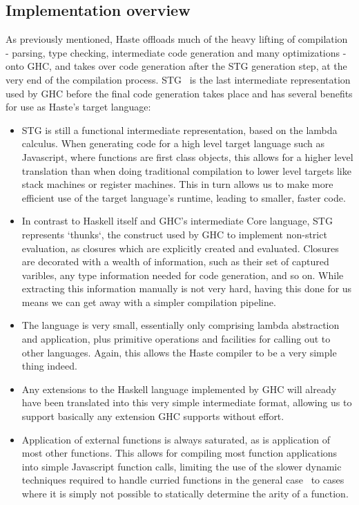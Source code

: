 \documentclass[preprint]{sigplanconf}
\begin{document}
\subsection{Implementation overview}

As previously mentioned, Haste offloads much of the heavy lifting of
compilation - parsing, type checking, intermediate code generation and many
optimizations - onto GHC, and takes over code generation after the STG
generation step, at the very end of the compilation process. STG\ \cite{stg} is
the last intermediate representation used by GHC before the final code
generation takes place and has several benefits for use as Haste's target
language:

\begin{itemize}
  \item STG is still a functional intermediate representation, based on the
        lambda calculus. When generating code for a high level target language
        such as Javascript, where functions are first class objects, this
        allows for a higher level translation than when doing traditional
        compilation to lower level targets like stack machines or register
        machines. This in turn allows us to make more efficient use of the
        target language's runtime, leading to smaller, faster code.
  \item In contrast to Haskell itself and GHC's intermediate Core language, STG
        represents `thunks`, the construct used by GHC to implement non-strict
        evaluation, as closures which are explicitly created and evaluated.
        Closures are decorated with a wealth of information, such as their set
        of captured varibles, any type information needed for code generation,
        and so on. While extracting this information manually is not very hard,
        having this done for us means we can get away with a simpler
        compilation pipeline.
  \item The language is very small, essentially only comprising lambda
        abstraction and application, plus primitive operations and facilities
        for calling out to other languages. Again, this allows the Haste
        compiler to be a very simple thing indeed.
  \item Any extensions to the Haskell language implemented by GHC will already
        have been translated into this very simple intermediate format,
        allowing us to support basically any extension GHC supports without
        effort.
  \item Application of external functions is always saturated, as is
        application of most other functions. This allows for compiling most
        function applications into simple Javascript function calls, limiting
        the use of the slower dynamic techniques required to handle curried
        functions in the general case\ \cite{fastcurry} to cases where it is
        simply not possible to statically determine the arity of a function.
\end{itemize}
\end{document}
